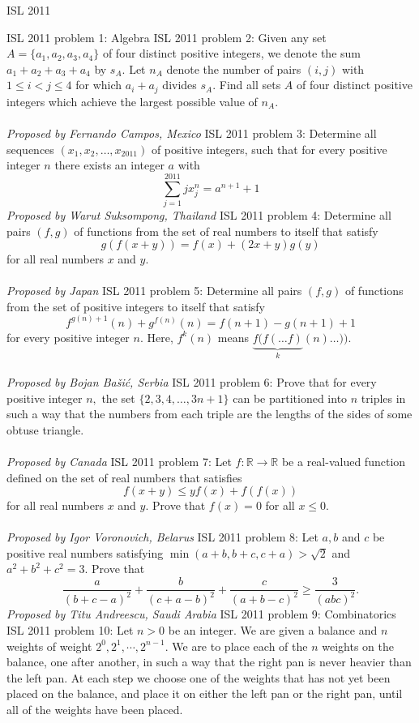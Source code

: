 ISL 2011 

ISL 2011 problem 1:  Algebra 
ISL 2011 problem 2:  Given any set $A = \{a_1, a_2, a_3, a_4\}$ of four distinct positive integers, we denote the sum $a_1 +a_2 +a_3 +a_4$ by $s_A$. Let $n_A$ denote the number of pairs $(i, j)$ with $1 \leq  i < j \leq 4$ for which $a_i +a_j$ divides $s_A$. Find all sets $A$ of four distinct positive integers which achieve the largest possible value of $n_A$. \\\\
\textit{Proposed by Fernando Campos, Mexico} 
ISL 2011 problem 3:  Determine all sequences $(x_1,x_2,\ldots,x_{2011})$ of positive integers, such that for every positive integer $n$ there exists an integer $a$ with
\[ \sum^{2011}_{j=1} j  x^n_j = a^{n+1} + 1 \]
\textit{Proposed by Warut Suksompong, Thailand} 
ISL 2011 problem 4:  Determine all pairs $(f,g)$ of functions from the set of real numbers to itself that satisfy
\[ g(f(x+y)) = f(x) + (2x + y)g(y) \]
for all real numbers $x$ and $y$. \\\\
\textit{Proposed by Japan} 
ISL 2011 problem 5:  Determine all pairs $(f,g)$ of functions from the set of positive integers to itself that satisfy
\[ f^{g(n)+1}(n) + g^{f(n)}(n) = f(n+1) - g(n+1) + 1 \]
for every positive integer $n$. Here, $f^k(n)$ means $\underbrace{f(f(\ldots f)}_k(n) \ldots ))$. \\\\
\textit{Proposed by Bojan Bašić, Serbia} 
ISL 2011 problem 6:  Prove that for every positive integer $n,$ the set $\{2,3,4,\ldots,3n+1\}$ can be partitioned into $n$ triples in such a way that the numbers from each triple are the lengths of the sides of some obtuse triangle. \\\\
\textit{Proposed by Canada} 
ISL 2011 problem 7:  Let $f : \mathbb R \to \mathbb R$ be a real-valued function defined on the set of real numbers that satisfies
\[ f(x + y) \leq yf(x) + f(f(x)) \]
for all real numbers $x$ and $y$. Prove that $f(x) = 0$ for all $x \leq 0$. \\\\
\textit{Proposed by Igor Voronovich, Belarus} 
ISL 2011 problem 8:  Let $a,b$ and $c$ be positive real numbers satisfying $\min(a+b,b+c,c+a) > \sqrt{2}$ and $a^2+b^2+c^2=3.$ Prove that
\[ \frac{a}{(b+c-a)^2} + \frac{b}{(c+a-b)^2} + \frac{c}{(a+b-c)^2} \geq \frac{3}{(abc)^2}. \]
\textit{Proposed by Titu Andreescu, Saudi Arabia} 
ISL 2011 problem 9:  Combinatorics 
ISL 2011 problem 10:  Let $n > 0$ be an integer. We are given a balance and $n$ weights of weight $2^0, 2^1, \cdots, 2^{n-1}$. We are to place each of the $n$ weights on the balance, one after another, in such a way that the right pan is never heavier than the left pan. At each step we choose one of the weights that has not yet been placed on the balance, and place it on either the left pan or the right pan, until all of the weights have been placed. \\
